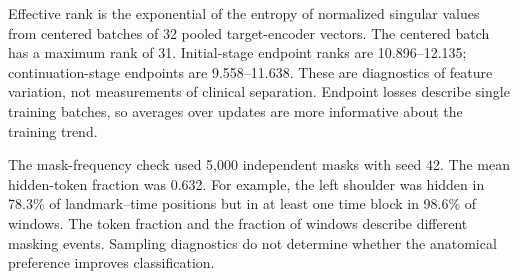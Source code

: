 Effective rank is the exponential of the entropy of normalized singular values from centered batches of 32 pooled target-encoder vectors. The centered batch has a maximum rank of 31. Initial-stage endpoint ranks are 10.896--12.135; continuation-stage endpoints are 9.558--11.638. These are diagnostics of feature variation, not measurements of clinical separation. Endpoint losses describe single training batches, so averages over updates are more informative about the training trend.

The mask-frequency check used 5,000 independent masks with seed 42. The mean hidden-token fraction was 0.632. For example, the left shoulder was hidden in 78.3\% of landmark--time positions but in at least one time block in 98.6\% of windows. The token fraction and the fraction of windows describe different masking events. Sampling diagnostics do not determine whether the anatomical preference improves classification.

